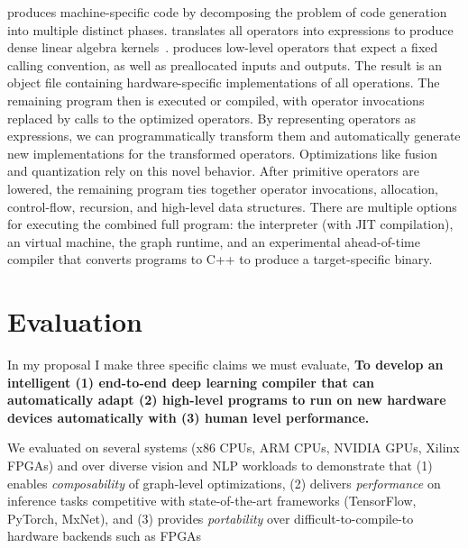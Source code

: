       \relay produces machine-specific code
        by decomposing the problem of code generation into multiple distinct phases.
      \relay translates all operators into \tvm expressions
        to produce dense linear algebra kernels~\citep{tvm_osdi18, tensor_comprehensions, halide}.
      \tvm produces low-level operators that expect a fixed calling convention,
        as well as preallocated inputs and outputs.
      The result is an object file containing hardware-specific implementations of all
        operations.
      The remaining \relay program then is executed or compiled,
        with operator invocations replaced by calls to the optimized operators.
      By representing operators as \tvm expressions, we can programmatically
        transform them and automatically generate new implementations for the transformed operators.
      Optimizations like fusion and quantization
        rely on this novel behavior.
      After primitive operators are lowered,
        the remaining \relay program ties
        together operator invocations, allocation, control-flow,
        recursion, and high-level data structures.
      There are multiple options for executing the combined full program:
        the \relay interpreter (with JIT compilation),
        an \relay virtual machine,
        the \tvm graph runtime,
        and an experimental \relay ahead-of-time compiler
        that converts programs to C++ to produce a target-specific binary.


      \section{Evaluation}
\label{sec:eval}


In my proposal I make three specific claims we must evaluate,
\textbf{To develop an intelligent (1) end-to-end deep learning compiler that can
automatically adapt (2) high-level programs to run on new hardware devices automatically
with (3) human level performance.}

We evaluated \relay on several systems (x86 CPUs, ARM CPUs, NVIDIA GPUs, Xilinx FPGAs) and over
  diverse vision and NLP workloads to demonstrate that (1) \relay enables \emph{composability} of
  graph-level optimizations, (2) \relay delivers \emph{performance} on inference tasks competitive
  with state-of-the-art frameworks (TensorFlow, PyTorch, MxNet), and (3) \relay provides
  \emph{portability} over difficult-to-compile-to hardware backends such as FPGAs

